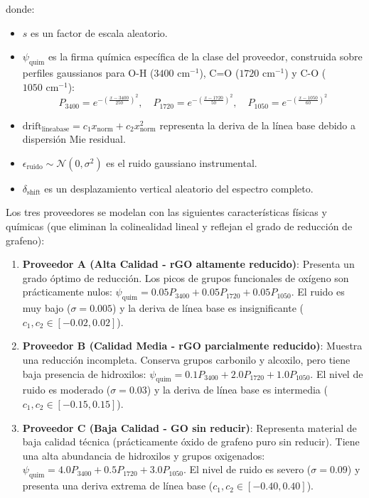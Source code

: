 donde:
\begin{itemize}
    \item $s$ es un factor de escala aleatorio.
    \item $\psi_{\text{quim}}$ es la firma química específica de la clase del proveedor, construida sobre perfiles gaussianos para O-H ($3400\text{ cm}^{-1}$), C=O ($1720\text{ cm}^{-1}$) y C-O ($1050\text{ cm}^{-1}$):
    \begin{equation}
        P_{3400} = e^{-\left(\frac{x - 3400}{250}\right)^2}, \quad P_{1720} = e^{-\left(\frac{x - 1720}{50}\right)^2}, \quad P_{1050} = e^{-\left(\frac{x - 1050}{60}\right)^2}
    \end{equation}
    \item $\text{drift}_{\text{lineabase}} = c_1 x_{\text{norm}} + c_2 x_{\text{norm}}^2$ representa la deriva de la línea base debido a dispersión Mie residual.
    \item $\epsilon_{\text{ruido}} \sim \mathcal{N}(0, \sigma^2)$ es el ruido gaussiano instrumental.
    \item $\delta_{\text{shift}}$ es un desplazamiento vertical aleatorio del espectro completo.
\end{itemize}

Los tres proveedores se modelan con las siguientes características físicas y químicas (que eliminan la colinealidad lineal y reflejan el grado de reducción de grafeno):
\begin{enumerate}
    \item \textbf{Proveedor A (Alta Calidad - rGO altamente reducido)}: Presenta un grado óptimo de reducción. Los picos de grupos funcionales de oxígeno son prácticamente nulos: $\psi_{\text{quim}} = 0.05 P_{3400} + 0.05 P_{1720} + 0.05 P_{1050}$. El ruido es muy bajo ($\sigma = 0.005$) y la deriva de línea base es insignificante ($c_1, c_2 \in [-0.02, 0.02]$).
    \item \textbf{Proveedor B (Calidad Media - rGO parcialmente reducido)}: Muestra una reducción incompleta. Conserva grupos carbonilo y alcoxilo, pero tiene baja presencia de hidroxilos: $\psi_{\text{quim}} = 0.1 P_{3400} + 2.0 P_{1720} + 1.0 P_{1050}$. El nivel de ruido es moderado ($\sigma = 0.03$) y la deriva de línea base es intermedia ($c_1, c_2 \in [-0.15, 0.15]$).
    \item \textbf{Proveedor C (Baja Calidad - GO sin reducir)}: Representa material de baja calidad técnica (prácticamente óxido de grafeno puro sin reducir). Tiene una alta abundancia de hidroxilos y grupos oxigenados: $\psi_{\text{quim}} = 4.0 P_{3400} + 0.5 P_{1720} + 3.0 P_{1050}$. El nivel de ruido es severo ($\sigma = 0.09$) y presenta una deriva extrema de línea base ($c_1, c_2 \in [-0.40, 0.40]$).
\end{enumerate}

